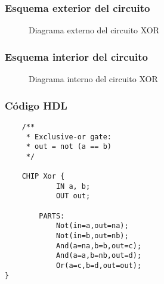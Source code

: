 \documentclass[12pt]{article}
\begin{document}
            \begin{table}[H]
            \centering
            \caption{Tabla de verdad de XOR}
            \label{tab:XOR}
            \end{table}
        \subsubsection{Esquema exterior del circuito}
            \begin{figure}[H]
                \centering
                
                \caption{Diagrama externo del circuito XOR} \cite{diagram}
                \label{fig:enter-label}
            \end{figure}
        \subsubsection{Esquema interior del circuito}
            \begin{figure}[H]
                \centering
                
                \caption{Diagrama interno del circuito XOR} \cite{diagram}
                \label{fig:enter-label}
            \end{figure}
        \newpage \subsubsection{Código HDL}  
        \begin{lstlisting}
    /**
     * Exclusive-or gate:
     * out = not (a == b)
     */
    
    CHIP Xor {
            IN a, b;
            OUT out;
        
        PARTS:
            Not(in=a,out=na);
            Not(in=b,out=nb);
            And(a=na,b=b,out=c);
            And(a=a,b=nb,out=d);
            Or(a=c,b=d,out=out);
}
        \end{lstlisting}
    \newpage
\end{document}
